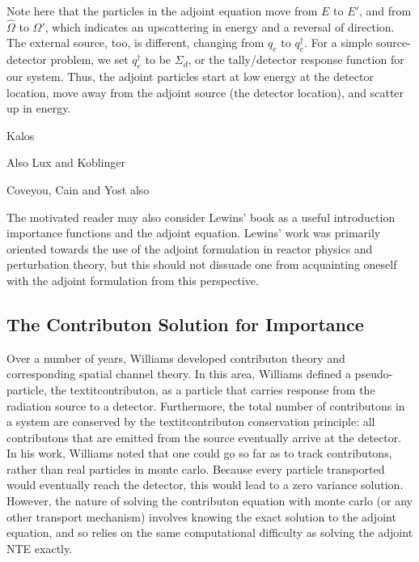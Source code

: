 Note here that the particles in the adjoint equation move from $E$ to $E'$, and from $\hat\Omega$ to $\hat\Omega'$, which indicates an upscattering in energy and a reversal of direction. The external source, too, is different, changing from $q_{e}$ to $q_{e}^\dagger$. For a simple source-detector problem, we set $q_{e}^\dagger$ to be $\Sigma _{ d }$, or the tally/detector response function for our system. Thus, the adjoint particles start at low energy at the detector location, move away from the adjoint source (the detector location), and scatter up in energy. 

Kalos \cite{kalos_importance_1963, goertzel_monte_1958}

Also Lux and Koblinger \cite{lux_monte_carlo}

Coveyou, Cain and Yost \cite{coveyou_adjoint_1967} also 


The motivated reader may also consider Lewins' book \cite{lewins_importance:_1965} as a
useful introduction importance functions and the adjoint equation. Lewins' work was
primarily oriented towards the use of the adjoint formulation in reactor physics and
 perturbation theory, but this should not dissuade one from acquainting oneself with the 
 adjoint formulation from this perspective. 



\subsection{The Contributon Solution for Importance}
\label{sec:ContributonImportance}

Over a number of years, Williams \cite{williams_generalized_1991,williams_contributorn_1992,williams_contributon_study} developed contributon theory and corresponding spatial channel theory. In this area, Williams defined a pseudo-particle, the textit{contributon}, as a particle that carries response from the radiation source to a detector. Furthermore, the total number of contributons in a system are conserved by the textit{contributon conservation principle}: all contributons that are emitted from the source eventually arrive at the detector.  In his work, Williams noted that one could go so far as to track contributons, rather than real particles in monte carlo. Because every particle transported would eventually reach the detector, this would lead to a zero variance solution. However, the nature of solving the contributon equation with monte carlo (or any other transport mechanism) involves knowing the exact solution to the adjoint equation, and so relies on the same computational difficulty as solving the adjoint NTE exactly. 

